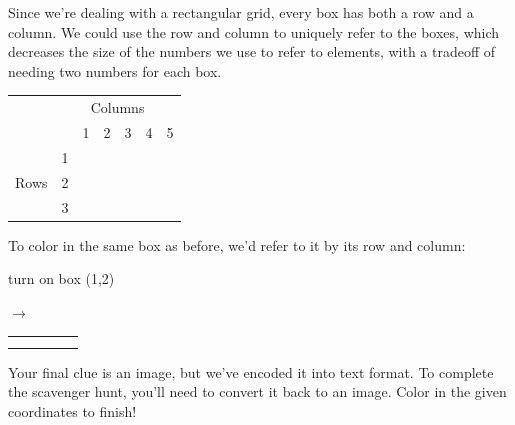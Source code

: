 \documentclass{article}
\begin{document}
Since we're dealing with a rectangular grid, every box has both a row and a column. We could use the row and column to uniquely refer to the boxes, which decreases the size of the numbers we use to refer to elements, with a tradeoff of needing two numbers for each box. 

\begin{center}
\begin{tabular}{*{7}{c|}}
\multicolumn{1}{c}{} & \multicolumn{6}{c}{Columns} \\ 
\multicolumn{2}{c}{} & \multicolumn{1}{c}{1} & \multicolumn{1}{c}{2} & \multicolumn{1}{c}{3} & \multicolumn{1}{c}{4} & \multicolumn{1}{c}{5} 
\\ \cline{3-7}
\multirow{3}{*}{Rows} & 1 & & & & & \\ \cline{3-7}
                      & 2 & & & & & \\ \cline{3-7}
                      & 3 & & & & & \\ \cline{3-7}
\end{tabular}
\end{center}


To color in the same box as before, we'd refer to it by its row and column: 

\begin{minipage}[c]{.4\linewidth}
\center
turn on box (1,2) 
\end{minipage}
\begin{minipage}[c]{.2\linewidth} $\rightarrow$ \end{minipage}
\begin{minipage}[c]{.4\linewidth}
\center
\begin{tabular}{*{5}{|c}|}
\hline
 &  & & & \\ \hline
 & & & & \\ \hline
 & & & & \\ \hline
\end{tabular}
\end{minipage}

Your final clue is an image, but we've encoded it into text format. To complete the scavenger hunt, you'll need to convert it back to an image. Color in the given coordinates to finish!

\newpage
\end{document}
